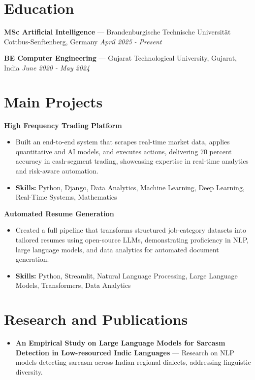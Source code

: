 \documentclass[a4paper,10pt]{article}
\begin{document}
\section*{Education}
\textbf{MSc Artificial Intelligence} — Brandenburgische Technische Universität Cottbus-Senftenberg, Germany \hfill \textit{April 2025 - Present}\par
\vspace{1.5pt}
\textbf{BE Computer Engineering} — Gujarat Technological University, Gujarat, India \hfill \textit{June 2020 - May 2024}\par

\section*{Main Projects}
\textbf{High Frequency Trading Platform}\par
\vspace{1pt}
\begin{itemize}
  \item Built an end-to-end system that scrapes real-time market data, applies quantitative and AI models, and executes actions, delivering 70 percent accuracy in cash-segment trading, showcasing expertise in real-time analytics and risk-aware automation.
  \item \textbf{Skills:} Python, Django, Data Analytics, Machine Learning, Deep Learning, Real-Time Systems, Mathematics
\end{itemize}
\vspace{3pt}
\textbf{Automated Resume Generation}\par
\vspace{1pt}
\begin{itemize}
  \item Created a full pipeline that transforms structured job-category datasets into tailored resumes using open-source LLMs, demonstrating proficiency in NLP, large language models, and data analytics for automated document generation.
  \item \textbf{Skills:} Python, Streamlit, Natural Language Processing, Large Language Models, Transformers, Data Analytics
\end{itemize}

\section*{Research and Publications}
\begin{itemize}
\item \textbf{An Empirical Study on Large Language Models for Sarcasm Detection in Low-resourced Indic Languages} — Research on NLP models detecting sarcasm across Indian regional dialects, addressing linguistic diversity.
\end{itemize}
\end{document}
